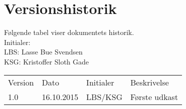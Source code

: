 \documentclass[pdftex, 11pt, a4paper, twoside, danish]{memoir}
\begin{document}
    \begin{titlingpage}
%        
    \end{titlingpage}
    
    \begingroup
        \hypersetup{linkcolor=black}
        \tableofcontents*	%
    \endgroup
    
    \section*{Versionshistorik}
    Følgende tabel viser dokumentets historik.\\    
    Initialer:\\
    LBS: Lasse Bue Svendsen\\
    KSG: Kristoffer Sloth Gade\\
    \begin{center}
    	\begin{tabular}{llll}
    		\rowcolor{grey} Version	& Dato 		& Initialer & Beskrivelse \\
    		1.0	 & 16.10.2015 	& LBS/KSG	& Første udkast\\
    	\end{tabular}
    \end{center}
    
    
    
    
    
    
    
    
    
    
    


    
    \listoftodos
\end{document}
